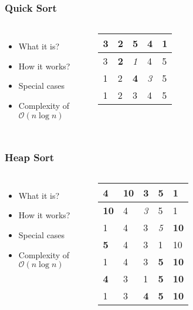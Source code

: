 \documentclass[compress]{beamer}
\begin{document}
\begin{frame}
\frametitle{Quick Sort}

\begin{columns}
\begin{itemize}
\item What it is?
\item How it works?
\item Special cases
\item Complexity of $\mathcal{O}(n\log{}n)$
\end{itemize}

\begin{table}[]
\begin{tabular}{|l|l|l|l|l|}
\hline
3 & 2 & \textbf{5} & 4 & 1 \\ \hline
3 & \textbf{2} & \textit{1} & 4 & 5 \\ \hline
1 & 2 & \textbf{4} & \textit{3} & 5 \\ \hline
1 & 2 & 3 & 4 & 5 \\ \hline
\end{tabular}
\end{table}

\end{columns}

\end{frame}


\begin{frame}
\frametitle{Heap Sort}

\begin{columns}
\begin{itemize}
\item What it is?
\item How it works?
\item Special cases
\item Complexity of $\mathcal{O}(n\log{}n)$
\end{itemize}
\begin{table}[]
\begin{tabular}{|l|l|l|l|l|}
\hline
4 & 10 & 3 & 5 & 1 \\ \hline
\textbf{10} & 4 & \textit{3} & 5 & 1 \\ \hline
1 & 4 & 3 & \textit{5} & \textbf{10} \\ \hline
\textbf{5} & 4 & 3 & 1 & 10 \\ \hline
1 & 4 & 3 & \textbf{5} & \textbf{10} \\ \hline
\textbf{4} & 3 & 1 & \textbf{5} & \textbf{10} \\ \hline
1 & 3 & \textbf{4} & \textbf{5} & \textbf{10} \\ \hline
\end{tabular}
\end{table}
\end{columns}

\end{frame}
\end{document}
